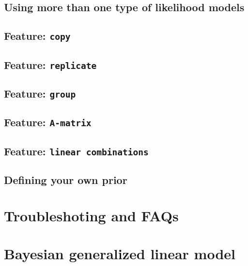 \documentclass[a4paper,11pt]{report}
\newcommand{\tv}{\texttt}
\begin{document}
\section{Using more than one type of likelihood models}

\section{Feature: \tv{copy}}

\section{Feature: \tv{replicate}}

\section{Feature: \tv{group}}

\section{Feature: \tv{A-matrix}}

\section{Feature: \tv{linear combinations}}

\section{Defining your own prior}



\chapter{Troubleshoting and FAQs}





\chapter{}



\clearpage




\chapter{Bayesian generalized linear model}
\end{document}
